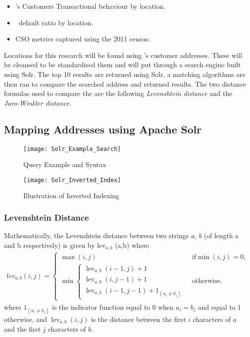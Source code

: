 \begin{itemize}
	\item \subjectname's Customers Transactional behaviour by location.
	\item \subjectname\ default ratio by location.
	\item CSO metrics captured using the 2011 census. 
\end{itemize}

Locations for this research will be found using \subjectname's customer addresses. These will be cleansed to be standardised them and will put through a search engine built using Solr. The top 10 results are returned using Solr, a matching algorithms are then ran to compare the searched address and returned results. The two distance formulas used to compare the are the following \textit{Levenshtein distance} and the \textit{Jaro-Winkler distance}.

\subsection{Mapping Addresses using Apache Solr}


\begin{figure}[h!]
	\texttt{[image: Solr\_Example\_Search]}
	\caption[Query Example and Syntax]
	{Query Example and Syntax}
	\label{fig:Solr_Example_Search}
\end{figure}

\begin{figure}[h!]
	\texttt{[image: Solr\_Inverted\_Index]}
	\caption[Illustration of Inverted Indexing]
	{Illustration of Inverted Indexing}
	\label{fig:Solr_Inverted_Index}
\end{figure}

\subsubsection{Levenshtein Distance}
Mathematically, the Levenshtein distance between two strings \textit{a}, \textit{b} (of length \text{\textbar}a\text{\textbar} and \text{\textbar}b\text{\textbar} respectively) is given by lev$_{a,b}$ (\text{\textbar}a\text{\textbar},\text{\textbar}b\text{\textbar}) where
\begin{align}
lev_{a,b}(i,j) = 
\begin{cases}
	\max(i,j) & \text{ if} \min(i,j)=0, \\
	\min \begin{cases}
		\operatorname{lev}_{a,b}(i-1,j) + 1 \\
		\operatorname{lev}_{a,b}(i,j-1) + 1 \\
		\operatorname{lev}_{a,b}(i-1,j-1) + 1_{(a_i \neq b_j)}
	\end{cases} & \text{ otherwise.}
\end{cases}
\end{align}
where $1_{(a_i \neq b_j)}$ is the indicator function equal to $0$ when $a_i = b_j$ and equal to 1 otherwise, and $\operatorname{lev}_{a,b}(i,j)$ is the distance between the first $i$ characters of $a$ and the first $j$ characters of $b$.


